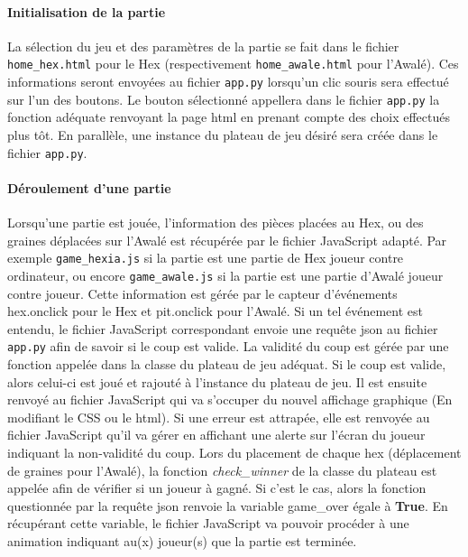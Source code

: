 \paragraph{Initialisation de la partie}
La sélection du jeu et des paramètres de la partie se fait dans le fichier \texttt{home\_hex.html} pour le Hex
(respectivement \texttt{home\_awale.html} pour l'Awalé). Ces informations seront envoyées au fichier \texttt{app.py}
lorsqu'un clic souris sera effectué sur l'un des boutons. Le bouton sélectionné appellera dans le fichier \texttt{app.py} la 
fonction adéquate renvoyant la page html en prenant compte des choix effectués plus tôt. En parallèle, une instance du plateau de
jeu désiré sera créée dans le fichier \texttt{app.py}. 

\paragraph{Déroulement d'une partie}
Lorsqu'une partie est jouée, l'information des pièces placées au Hex, ou des graines déplacées sur l'Awalé est récupérée par
le fichier JavaScript adapté. Par exemple \texttt{game\_hexia.js} si la partie est une partie de Hex joueur contre ordinateur, ou encore 
\texttt{game\_awale.js} si la partie est une partie d'Awalé joueur contre joueur. Cette information est gérée par le capteur d'événements
hex.onclick pour le Hex et pit.onclick pour l'Awalé. Si un tel événement est entendu, le fichier JavaScript correspondant envoie une requête 
json au fichier \texttt{app.py} afin de savoir si le coup est valide. La validité du coup est gérée par une fonction appelée dans la classe du
plateau de jeu adéquat. Si le coup est valide, alors celui-ci est joué et rajouté à l'instance du plateau de jeu. Il est ensuite renvoyé au fichier 
JavaScript qui va s'occuper du nouvel affichage graphique (En modifiant le CSS ou le html). Si une erreur est attrapée, elle est renvoyée
au fichier JavaScript qu'il va gérer en affichant une alerte sur l'écran du joueur indiquant la non-validité du coup. Lors du placement de chaque
hex (déplacement de graines pour l'Awalé), la fonction \textit{check\_winner} de la classe du plateau est appelée afin de vérifier si un joueur à 
gagné. Si c'est le cas, alors la fonction questionnée par la requête json renvoie la variable \textsf{game\_over} égale à \textbf{True}. 
En récupérant cette variable, le fichier JavaScript va pouvoir procéder à une animation indiquant au(x) joueur(s) que la partie est terminée.



